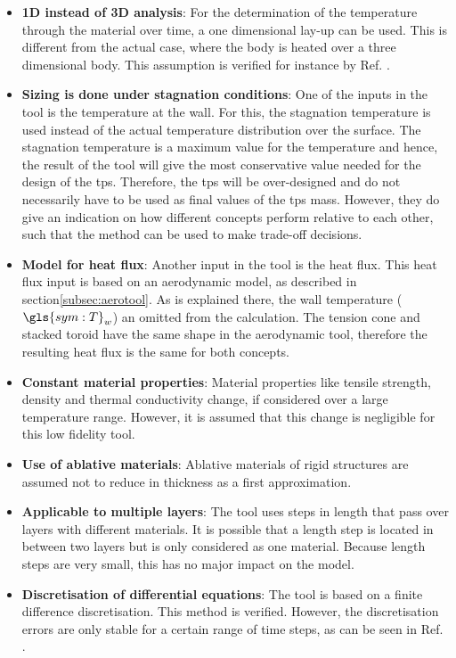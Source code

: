 \begin{itemize}
\item \textbf{1D instead of 3D analysis}: For the determination of the temperature through the material over time, a one dimensional lay-up can be used. This is different from the actual case, where the body is heated over a three dimensional body. This assumption is verified for instance by Ref. \cite{Corso2009}.
\item \textbf{Sizing is done under stagnation conditions}: One of the inputs in the tool is the temperature at the wall. For this, the stagnation temperature is used instead of the actual temperature distribution over the surface. The stagnation temperature is a maximum value for the temperature and hence, the result of the tool will give the most conservative value needed for the design of the \gls{tps}. Therefore, the \gls{tps} will be over-designed and do not necessarily have to be used as final values of the \gls{tps} mass. However, they do give an indication on how different concepts perform relative to each other, such that the method can be used to make trade-off decisions.
\item \textbf{Model for heat flux}: Another input in the tool is the heat flux. This heat flux input is based on an aerodynamic model, as described in section\ref{subsec:aerotool}. As is explained there, the wall temperature ($\gls{sym:T}_w$) an omitted from the calculation. The tension cone and stacked toroid have the same shape in the aerodynamic tool, therefore the resulting heat flux is the same for both concepts.
\item \textbf{Constant material properties}: Material properties like tensile strength, density and thermal conductivity change, if considered over a large temperature range. However, it is assumed that this change is negligible for this low fidelity tool. 
\item \textbf{Use of ablative materials}: Ablative materials of rigid structures are assumed not to reduce in thickness as a first approximation.
\item \textbf{Applicable to multiple layers}: The tool uses steps in length that pass over layers with different materials. It is possible that a length step is located in between two layers but is only considered as one material. Because length steps are very small, this has no major impact on the model.
\item \textbf{Discretisation of differential equations}: The tool is based on a finite difference discretisation. This method is verified. However, the discretisation errors are only stable for a certain range of time steps, as can be seen in Ref. \cite{Smith2011, Holman2002}. 
\end{itemize}

